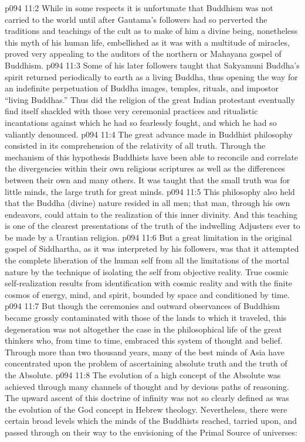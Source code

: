 \pc \vs p094 11:2 While in some respects it is unfortunate that Buddhism was not carried to the world until after Gautama’s followers had so perverted the traditions and teachings of the cult as to make of him a divine being, nonetheless this myth of his human life, embellished as it was with a multitude of miracles, proved very appealing to the auditors of the northern or Mahayana gospel of Buddhism.
\vs p094 11:3 Some of his later followers taught that Sakyamuni Buddha’s spirit returned periodically to earth as a living Buddha, thus opening the way for an indefinite perpetuation of Buddha images, temples, rituals, and impostor “living Buddhas.” Thus did the religion of the great Indian protestant eventually find itself shackled with those very ceremonial practices and ritualistic incantations against which he had so fearlessly fought, and which he had so valiantly denounced.
\pc \vs p094 11:4 The great advance made in Buddhist philosophy consisted in its comprehension of the relativity of all truth. Through the mechanism of this hypothesis Buddhists have been able to reconcile and correlate the divergencies within their own religious scriptures as well as the differences between their own and many others. It was taught that the small truth was for little minds, the large truth for great minds.
\vs p094 11:5 This philosophy also held that the Buddha (divine) nature resided in all men; that man, through his own endeavors, could attain to the realization of this inner divinity. And this teaching is one of the clearest presentations of the truth of the indwelling Adjusters ever to be made by a Urantian religion.
\vs p094 11:6 But a great limitation in the original gospel of Siddhartha, as it was interpreted by his followers, was that it attempted the complete liberation of the human self from all the limitations of the mortal nature by the technique of isolating the self from objective reality. True cosmic self\hyp{}realization results from identification with cosmic reality and with the finite cosmos of energy, mind, and spirit, bounded by space and conditioned by time.
\vs p094 11:7 But though the ceremonies and outward observances of Buddhism became grossly contaminated with those of the lands to which it traveled, this degeneration was not altogether the case in the philosophical life of the great thinkers who, from time to time, embraced this system of thought and belief. Through more than two thousand years, many of the best minds of Asia have concentrated upon the problem of ascertaining absolute truth and the truth of the Absolute.
\vs p094 11:8 The evolution of a high concept of the Absolute was achieved through many channels of thought and by devious paths of reasoning. The upward ascent of this doctrine of infinity was not so clearly defined as was the evolution of the God concept in Hebrew theology. Nevertheless, there were certain broad levels which the minds of the Buddhists reached, tarried upon, and passed through on their way to the envisioning of the Primal Source of universes:
